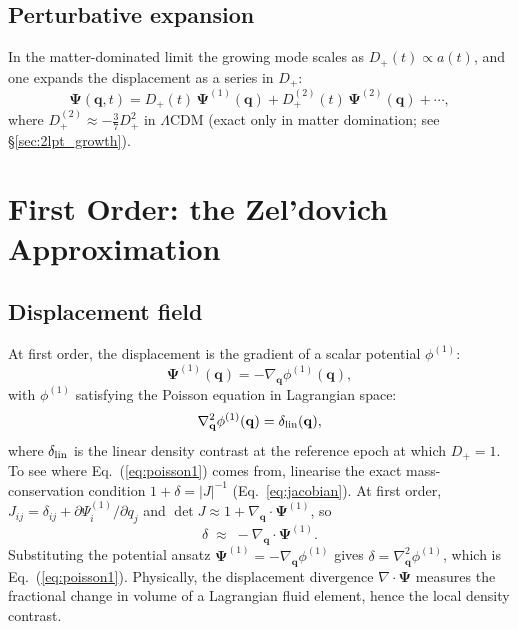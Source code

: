 \documentclass[12pt]{article}
\newcommand{\bq}{\mathbf{q}}
\newcommand{\bPsi}{\boldsymbol{\Psi}}
\newcommand{\Dp}{D_+}
\newcommand{\Dpp}{D_+^{(2)}}
\begin{document}
\subsection{Perturbative expansion}

In the matter-dominated limit the growing mode scales as $\Dp(t)
\propto a(t)$, and one expands the displacement as a series in
$\Dp$:
%
\begin{equation}
  \bPsi(\bq, t)
    = \Dp(t)\,\bPsi^{(1)}(\bq)
    + \Dpp(t)\,\bPsi^{(2)}(\bq)
    + \cdots,
  \label{eq:lpt_expansion}
\end{equation}
%
where $\Dpp \approx -\tfrac{3}{7}\Dp^2$ in $\Lambda$CDM (exact only in
matter domination; see \S\ref{sec:2lpt_growth}).

\section{First Order: the Zel'dovich Approximation}
\label{sec:za}

\subsection{Displacement field}

At first order, the displacement is the gradient of a scalar potential
$\phi^{(1)}$:
%
\begin{equation}
  \bPsi^{(1)}(\bq) = -\nabla_\bq\phi^{(1)}(\bq),
  \label{eq:psi1}
\end{equation}
%
with $\phi^{(1)}$ satisfying the Poisson equation in Lagrangian space:
%
\begin{equation}
  \nabla_\bq^2\phi^{(1)}(\bq) = \delta_{\rm lin}(\bq),
  \label{eq:poisson1}
\end{equation}
%
where $\delta_{\rm lin}$ is the linear density contrast at the
reference epoch at which $\Dp = 1$.
To see where Eq.~(\ref{eq:poisson1}) comes from, linearise the exact
mass-conservation condition $1+\delta = |J|^{-1}$
(Eq.~\ref{eq:jacobian}).
At first order, $J_{ij}=\delta_{ij}+\partial\Psi^{(1)}_i/\partial q_j$
and $\det J\approx 1+\nabla_\bq\cdot\bPsi^{(1)}$, so
%
\begin{equation*}
  \delta \;\approx\; -\nabla_\bq\cdot\bPsi^{(1)}.
\end{equation*}
%
Substituting the potential ansatz $\bPsi^{(1)}=-\nabla_\bq\phi^{(1)}$
gives $\delta=\nabla_\bq^2\phi^{(1)}$, which is
Eq.~(\ref{eq:poisson1}). Physically, the displacement divergence
$\nabla\cdot\bPsi$ measures the fractional change in volume of a
Lagrangian fluid element, hence the local density contrast.
\end{document}
